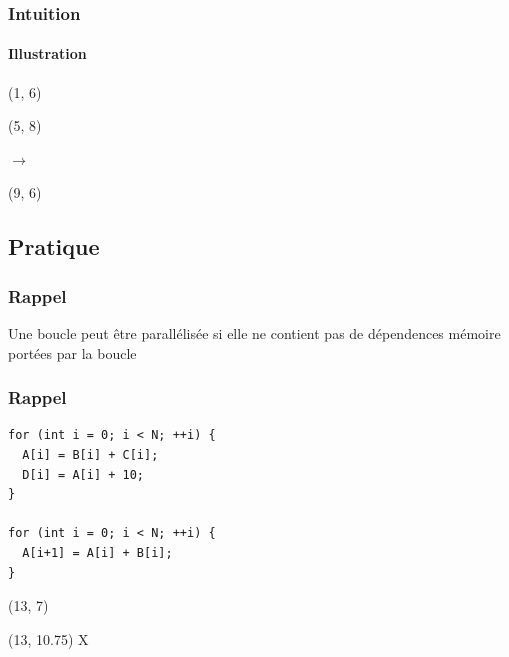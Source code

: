 \documentclass{beamer}
\begin{document}
\begin{frame}
\frametitle{Intuition}
\framesubtitle{Illustration}
\begin{textblock}{6}(1, 6)
\begin{center}
\end{center}
\end{textblock}

\begin{textblock}{6}(5, 8)
\begin{center}
\Huge{$\rightarrow$}
\end{center}
\end{textblock}

\begin{textblock}{6}(9, 6)
\begin{center}
\end{center}
\end{textblock}
\end{frame}

\subsection{Pratique}
\begin{frame}
\frametitle{Rappel}
Une boucle peut être parallélisée si elle ne contient pas de dépendences mémoire portées par la boucle
\end{frame}

\begin{frame}[fragile]
\frametitle{Rappel}
\begin{lstlisting}
for (int i = 0; i < N; ++i) {
  A[i] = B[i] + C[i];
  D[i] = A[i] + 10;
}

for (int i = 0; i < N; ++i) {
  A[i+1] = A[i] + B[i];
}
\end{lstlisting}
\begin{textblock}{6}(13, 7)
	\Huge{\checkmark}
\end{textblock}
\begin{textblock}{6}(13, 10.75)
	\Huge{X}
\end{textblock}
\end{frame}
\end{document}
